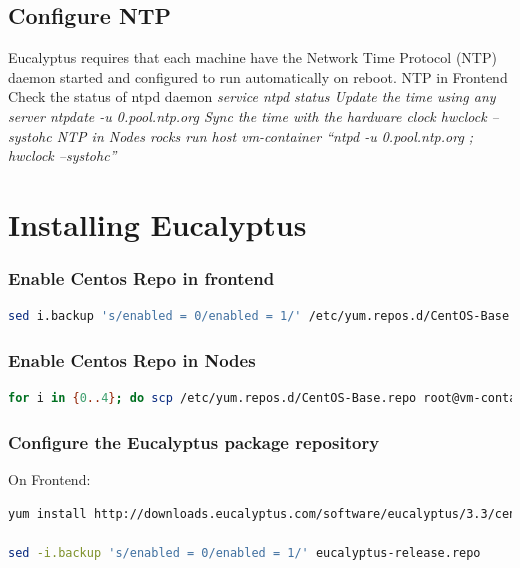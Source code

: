 \section{Configure NTP}

Eucalyptus requires that each machine have the Network Time Protocol (NTP) daemon started and configured to run automatically on reboot.
\linebreak
NTP in Frontend
\linebreak
Check the status of ntpd daemon 
\em{service ntpd status}
\linebreak
Update the time using any server
\em{ntpdate -u 0.pool.ntp.org}
\linebreak
Sync the time with the hardware clock 
\em{hwclock --systohc}
\linebreak
NTP in Nodes
\em{rocks run host vm-container “ntpd -u 0.pool.ntp.org ; hwclock --systohc”}

\chapter{Installing Eucalyptus}
\subsection{Enable Centos Repo in frontend }
\begin{lstlisting}[language=bash]
sed i.backup 's/enabled = 0/enabled = 1/' /etc/yum.repos.d/CentOS-Base.repo
\end{lstlisting}
\subsection{Enable Centos Repo in Nodes }
\begin{lstlisting}[language=bash]
for i in {0..4}; do scp /etc/yum.repos.d/CentOS-Base.repo root@vm-container-0-$i:/etc/yum.repos.d/CentOS-Base.repo; done
\end{lstlisting} 
\subsection{Configure the Eucalyptus package repository} 
On Frontend:
\begin{lstlisting}[language=bash]
yum install http://downloads.eucalyptus.com/software/eucalyptus/3.3/centos/6/x86_64/eucalyptus-release-3.3.noarch.rpm 

sed -i.backup 's/enabled = 0/enabled = 1/' eucalyptus-release.repo 
\end{lstlisting} 


